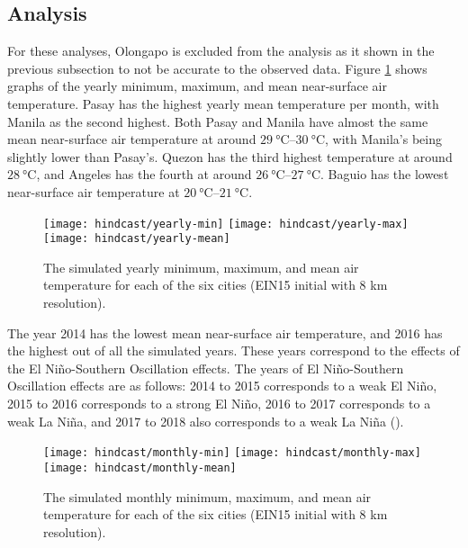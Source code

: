 	\subsection{Analysis}
		For these analyses, Olongapo is excluded from the analysis as it shown in the previous subsection to not be accurate to the observed data.
		Figure \ref{fig:hindcast-yearly-stats} shows graphs of the yearly minimum, maximum, and mean near-surface air temperature.		
		Pasay has the highest yearly mean temperature per month, with Manila as the second highest.
		Both Pasay and Manila have almost the same mean near-surface air temperature at around $\qtyrange{29}{30}{\degreeCelsius}$, with Manila's being slightly lower than Pasay's.
		Quezon has the third highest temperature at around $\qty{28}{\degreeCelsius}$, 
			and Angeles has the fourth at around $\qtyrange{26}{27}{\degreeCelsius}$.
		Baguio has the lowest near-surface air temperature at $\qtyrange{20}{21}{\degreeCelsius}$.
		
		\begin{figure}	
			\centering
			\texttt{[image: hindcast/yearly-min]}
			\texttt{[image: hindcast/yearly-max]}
			\texttt{[image: hindcast/yearly-mean]}
			\caption{
				The simulated yearly minimum, maximum, and mean air temperature for each of the six cities (EIN15 initial with 8 km resolution).
			}
			\label{fig:hindcast-yearly-stats}
		\end{figure}

		The year 2014 has the lowest mean near-surface air temperature, and 2016 has the highest out of all the simulated years.
		These years correspond to the effects of the El Niño-Southern Oscillation effects.
		The years of El Niño-Southern Oscillation effects are as follows:
			2014 to 2015 corresponds to a weak El Niño,
			2015 to 2016 corresponds to a strong El Niño,
			2016 to 2017 corresponds to a weak La Niña,
			and
			2017 to 2018 also corresponds to a weak La Niña
			(\cite{Null2025}).

		\begin{figure}	
			\centering
			\texttt{[image: hindcast/monthly-min]}
			\texttt{[image: hindcast/monthly-max]}
			\texttt{[image: hindcast/monthly-mean]}
			\caption{
				The simulated monthly minimum, maximum, and mean air temperature for each of the six cities (EIN15 initial with 8 km resolution).
			}
			\label{fig:hindcast-monthly-stats}
		\end{figure}
	
